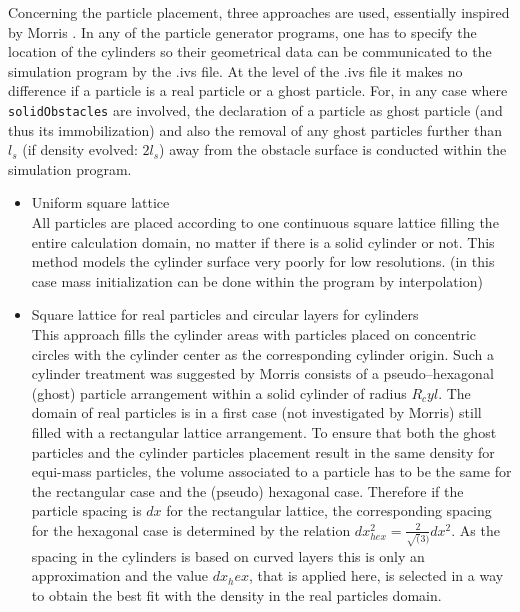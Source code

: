 \documentclass{report}
\begin{document}
Concerning the particle placement, three approaches are used, essentially inspired by Morris \cite{Morris1997, Zhu1999}. In any of the particle generator programs, one has to specify the location of the cylinders so their geometrical data can be communicated to the simulation program by the .ivs file. At the level of the .ivs file it makes no difference if a particle is a real particle or a ghost particle. For, in any case where {\tt solidObstacles} are involved, the declaration of a particle as ghost particle (and thus its immobilization) and also the removal of any ghost particles further than $l_s$ (if density evolved: $2l_s$) away from the obstacle surface is conducted within the simulation program. 

\begin{itemize}

 \item Uniform square lattice\\
  All particles are placed according to one continuous square lattice filling the entire calculation domain, no matter if there is a solid cylinder or not. This method
  models the cylinder surface very poorly for low resolutions.
(in this case mass initialization can be done within the program by interpolation)

\item Square lattice for real particles and circular layers for cylinders\\
This approach fills the cylinder areas with particles placed on concentric circles with the cylinder center as the corresponding cylinder origin.
Such a cylinder treatment was suggested by Morris \cite{Zhu1999} consists of a pseudo--hexagonal (ghost) particle arrangement within a solid cylinder of radius $R_cyl$. The domain of real particles is in a first case (not investigated by Morris) still filled with a rectangular lattice arrangement. To ensure that both the ghost particles and the cylinder particles placement result in the same density for equi-mass particles, the volume associated to a particle has to be the same for the rectangular case and the (pseudo) hexagonal case. Therefore if the particle spacing is $dx$ for the rectangular lattice, the corresponding spacing for the hexagonal case is determined by the relation $dx_\mathit{hex}^2=\frac{2}{\sqrt(3)}dx^2$. As the spacing in the cylinders is based on curved layers this is only an approximation and the value $dx_hex$, that is applied here, is selected in a way to obtain the best fit with the density in the real particles domain.


\end{itemize}
\end{document}

